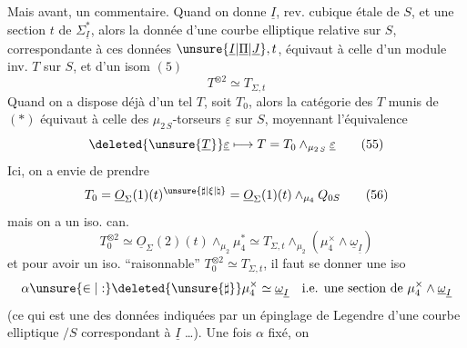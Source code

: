 Mais avant, un commentaire. Quand on donne $\underline I$, rev. cubique étale de $S$, et une section $t$ de $\Sigma_{\underline I}^*$, alors la donnée d'une courbe elliptique relative sur $S$, correspondante à ces données $\unsure{\underline I|\underline\Pi|\underline J},t$, équivaut à celle d'un module inv. $T$ sur $S$, et d'un isom $(5)$
\[
T^{\otimes2}\simeq T_{\Sigma,t} \tag*{(*)}
\]
Quand on a dispose déjà d'un tel $T$, soit $T_0$, alors la catégorie des $T$  munis de $(*)$ équivaut à celle des $\mu_{2\,S}$-torseurs $\underline\varepsilon$ sur $S$, moyennant l'équivalence
\[
\deleted{\unsure{\underline T}}\underline\varepsilon\longmapsto T=T_0\mathbin{\wedge}_{\mu_{2\,S}}\underline\varepsilon \tag*{(55)}
\]
Ici, on a envie de prendre
\[
T_0=\underline O_\Sigma(1)(t)^{\unsure{\sharp|\xi|\natural}}=\underline O_\Sigma(1)(t)\mathbin{\wedge}_{\mu_4}Q_{0S} \tag*{(56)}
\]
mais on a un iso. can.
\[
T_0^{\otimes2}\simeq\underline O_\Sigma(2)(t)\mathbin{\wedge}_{\mu_2}\mu_4^*
\simeq T_{\Sigma,t}\mathbin{\wedge}_{\mu_2}(\mu_4^\times\mathbin{\wedge}\underline\omega_{\underline I})
\]
et pour avoir un iso. ``raisonnable'' $T_0^{\otimes2}\simeq T_{\Sigma,t}$, il faut se donner une  iso
\[
\alpha\unsure{\in|:}\deleted{\unsure{\sharp}}\mu_4^\times\simeq\underline\omega_{\underline I}
\quad\text{i.e. une section de }\mu_4^\times\mathbin{\wedge}\underline\omega_{\underline I}
\]
(ce qui est une des données indiquées par un épinglage de Legendre d'une courbe elliptique $/S$ correspondant à $\underline I$ \ldots). Une fois $\alpha$ fixé, on
